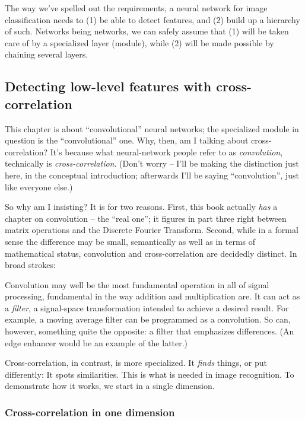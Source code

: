 \documentclass[
  letterpaper,
]{krantz}
\begin{document}
The way we've spelled out the requirements, a neural network for image
classification needs to (1) be able to detect features, and (2) build up
a hierarchy of such. Networks being networks, we can safely assume that
(1) will be taken care of by a specialized layer (module), while (2)
will be made possible by chaining several layers.

\hypertarget{detecting-low-level-features-with-cross-correlation}{%
\subsection{\texorpdfstring{Detecting low-level features with
cross-correlation}{Detecting low-level features with cross-correlation}}\label{detecting-low-level-features-with-cross-correlation}}

This chapter is about ``convolutional'' neural networks; the specialized
module in question is the ``convolutional'' one. Why, then, am I talking
about cross-correlation? It's because what neural-network people refer
to as \emph{convolution}, technically is
\emph{cross-correlation}. (Don't worry -- I'll be making the distinction
just here, in the conceptual introduction; afterwards I'll be saying
``convolution'', just like everyone else.)

So why am I insisting? It is for two reasons. First, this book actually
\emph{has} a chapter on convolution -- the ``real one''; it figures in
part three right between matrix operations and the Discrete Fourier
Transform. Second, while in a formal sense the difference may be small,
semantically as well as in terms of mathematical status, convolution and
cross-correlation are decidedly distinct. In broad strokes:

Convolution may well be the most fundamental operation in all of signal
processing, fundamental in the way addition and multiplication are. It
can act as a \emph{filter}, a signal-space transformation intended to
achieve a desired result. For example, a moving average filter can be
programmed as a convolution. So can, however, something quite the
opposite: a filter that emphasizes differences. (An edge enhancer would
be an example of the latter.)

Cross-correlation, in contrast, is more specialized. It \emph{finds}
things, or put differently: It spots similarities. This is what is
needed in image recognition. To demonstrate how it works, we start in a
single dimension.

\hypertarget{cross-correlation-in-one-dimension}{%
\subsubsection{Cross-correlation in one
dimension}\label{cross-correlation-in-one-dimension}}
\end{document}
